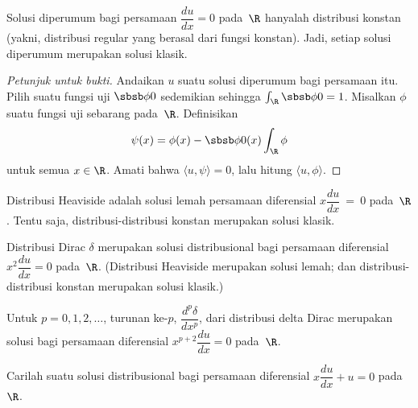 \begin{exam} Solusi diperumum bagi persamaan $\dfrac{du}{dx} = 0$ pada~$\R$ hanyalah distribusi konstan (yakni,
distribusi regular yang berasal dari fungsi konstan). Jadi, setiap solusi diperumum merupakan solusi klasik.
\end{exam}

\begin{proof}[\emph{Petunjuk untuk bukti}] Andaikan $u$ suatu solusi diperumum bagi persamaan itu. Pilih suatu fungsi uji $\sbsb\phi 0$ sedemikian
sehingga $\int_\R \sbsb\phi 0 = 1$. Misalkan $\phi$ suatu fungsi uji sebarang pada~$\R$. Definisikan
   \[ \psi(x) = \phi(x) - \sbsb\phi 0(x)\int_\R \phi \]
untuk semua $x \in \R$. Amati bahwa $\langle u,\psi \rangle = 0$, lalu hitung $\langle u,\phi \rangle$.  \ns
\end{proof}

\begin{exam} Distribusi Heaviside adalah solusi lemah persamaan diferensial $x\dfrac{du}{dx}~=~0$ pada~$\R$. Tentu saja,
distribusi-distribusi konstan merupakan solusi klasik.
\end{exam}

\begin{exam} Distribusi Dirac $\delta$ merupakan solusi distribusional bagi persamaan diferensial $x^2\dfrac{du}{dx} = 0$ pada~$\R$.
(Distribusi Heaviside merupakan solusi lemah; dan distribusi-distribusi konstan merupakan solusi klasik.)
\end{exam}

\begin{exam} Untuk $p = 0,1,2,\dots$, turunan ke-$p$, $\dfrac{d^p\delta}{dx^p}$, dari distribusi delta Dirac merupakan solusi
bagi persamaan diferensial $x^{p+2}\dfrac{du}{dx} = 0$ pada~$\R$.
\end{exam}

\begin{exer} Carilah suatu solusi distribusional bagi persamaan diferensial $x \dfrac{du}{dx} + u = 0$ pada~$\R$.
\end{exer}










